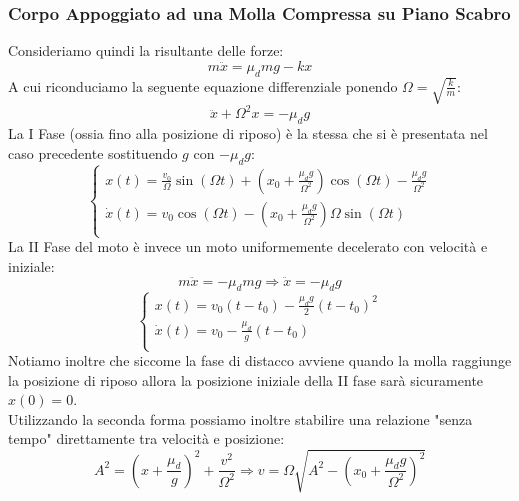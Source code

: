 \documentclass{article}
\newcommand{\note}{\noindent {\quad \bf \underline{Osservazione:}} \quad}
\newcommand{\then}{\ensuremath{\Rightarrow}}
\begin{document}
\subsubsection{Corpo Appoggiato ad una Molla Compressa su Piano Scabro}
Consideriamo quindi la risultante delle forze:
\[m\ddot{x}=\mu_dmg-kx\]
A cui riconduciamo la seguente equazione differenziale ponendo $\Omega=\sqrt{\frac{k}{m}}$:
\[\ddot{x}+\Omega^2x=-\mu_dg\]
La I Fase (ossia fino alla posizione di riposo) è la stessa che si è presentata nel caso precedente sostituendo $g$ con $-\mu_dg$:
\[\left\{\begin{array}{l}
    x(t)=\frac{v_0}{\Omega}\sin(\Omega t)+\left(x_0+\frac{\mu_dg}{\Omega^2}\right)\cos(\Omega t)-\frac{\mu_dg}{\Omega^2} \\
    \Dot{x}(t)=v_0\cos(\Omega t)-\left(x_0+\frac{\mu_dg}{\Omega^2}\right)\Omega\sin(\Omega t)  \\
\end{array}\right.\]
La II Fase del moto è invece un moto uniformemente decelerato con velocità e iniziale:
\[m\ddot{x}=-\mu_dmg\then \ddot{x}=-\mu_dg\]
\[\left\{\begin{array}{l}
    x(t)=v_0(t-t_0)-\frac{\mu_dg}{2}(t-t_0)^2  \\
    \Dot{x}(t)=v_0-\frac{\mu_d}{g}(t-t_0)  \\
\end{array}\right.\]
Notiamo inoltre che siccome la fase di distacco avviene quando la molla raggiunge la posizione di riposo allora la posizione iniziale della II fase sarà sicuramente $x(0)=0$.\\
\note Utilizzando la seconda forma possiamo inoltre stabilire una relazione "senza tempo" direttamente tra velocità e posizione:
\begin{equation}
    A^2=\left(x+\frac{\mu_d}{g}\right)^2+\frac{v^2}{\Omega^2}\then \boxed{v=\Omega\sqrt{A^2-\left(x_0+\frac{\mu_dg}{\Omega^2}\right)^2}}
\end{equation}
\end{document}
